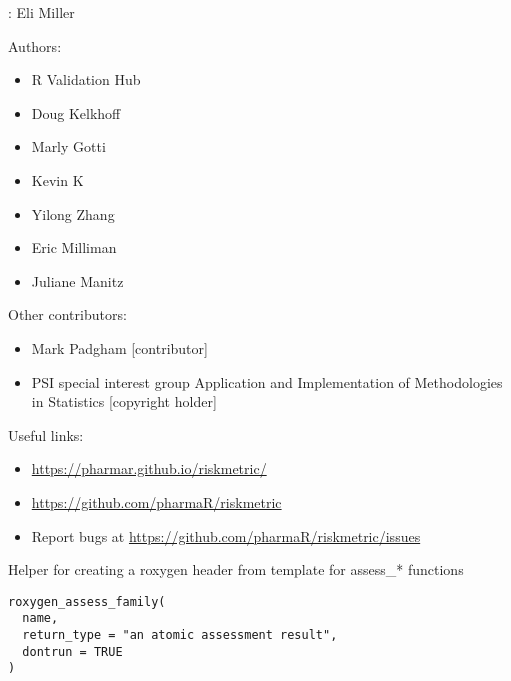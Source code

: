 \documentclass[a4paper]{book}
\begin{document}
\begin{Author}
: Eli Miller 

Authors:
\begin{itemize}

\item{} R Validation Hub 
\item{} Doug Kelkhoff 
\item{} Marly Gotti
\item{} Kevin K
\item{} Yilong Zhang
\item{} Eric Milliman
\item{} Juliane Manitz

\end{itemize}


Other contributors:
\begin{itemize}

\item{} Mark Padgham [contributor]
\item{} PSI special interest group Application and Implementation of Methodologies in Statistics [copyright holder]

\end{itemize}


\end{Author}
%
\begin{SeeAlso}
Useful links:
\begin{itemize}

\item{} \url{https://pharmar.github.io/riskmetric/}
\item{} \url{https://github.com/pharmaR/riskmetric}
\item{} Report bugs at \url{https://github.com/pharmaR/riskmetric/issues}

\end{itemize}


\end{SeeAlso}
%
\begin{Description}
Helper for creating a roxygen header from template for assess\_* functions
\end{Description}
%
\begin{Usage}
\begin{verbatim}
roxygen_assess_family(
  name,
  return_type = "an atomic assessment result",
  dontrun = TRUE
)
\end{verbatim}
\end{Usage}
\end{document}
